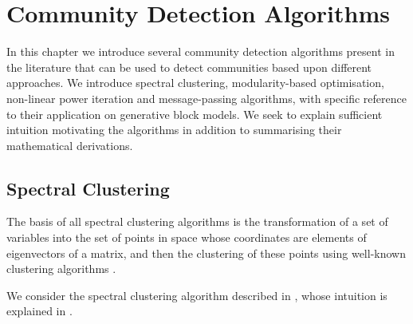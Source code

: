 
\chapter{Community Detection Algorithms}

\label{cha:communityDetectionAlgorithms}


In this chapter we introduce several community detection algorithms present in the literature that can be used to detect communities based upon different approaches.
We introduce spectral clustering, modularity-based optimisation, non-linear power iteration and message-passing algorithms, with specific reference to their application on generative block models.
We seek to explain sufficient intuition motivating the algorithms in addition to summarising their mathematical derivations.


\section{Spectral Clustering}
\label{sec:spectralClustering}

The basis of all spectral clustering algorithms is the transformation of a set of variables into the set of points in space whose coordinates are elements of eigenvectors of a matrix, and then the clustering of these points using well-known clustering algorithms \cite{Lux06,For10}.

We consider the spectral clustering algorithm described in \cite{Lux06,For10}, whose intuition is explained in \cite{Lux06,Spi07,For10}.

